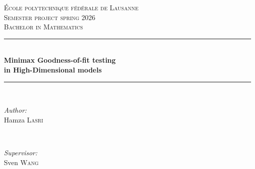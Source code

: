 \begin{titlepage}
\newcommand{\HRule}{\rule{\linewidth}{0.5mm}} %

\center %
 

\vspace{3cm}
\textsc{\LARGE École polytechnique fédérale de Lausanne}\\[1.5cm] %
\textsc{\Large Semester project spring 2026 }\\[0.5cm] %
\textsc{\large Bachelor in Mathematics}\\[0.5cm] %


\HRule \\[0.4cm] %
{ \huge \bfseries Minimax Goodness-of-fit testing \\ in High-Dimensional models}\\[0.4cm] %
\HRule \\[1.5cm]
 

\begin{minipage}{0.4\textwidth}
\begin{flushleft} \large
\emph{Author:}\\
Hamza \textsc{Lasri} %
\end{flushleft}
\end{minipage}
~
\begin{minipage}{0.4\textwidth}
\begin{flushright} \large
\emph{Supervisor:} \\
Sven \textsc{Wang} %
\end{flushright}
\end{minipage}\\[10cm]


\end{titlepage}
